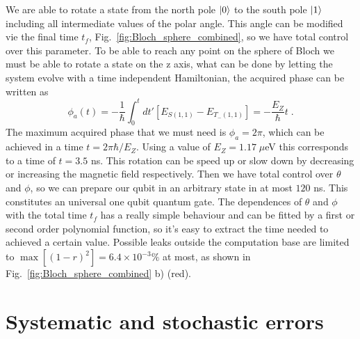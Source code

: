 We are able to rotate a state from the north pole $\ket{0}$ to the south pole $\ket{1}$ including all intermediate values of the polar angle. This angle can be modified vie the final time $t_f$, Fig.~\ref{fig:Bloch_sphere_combined}, so we have total control over this parameter. To be able to reach any point on the sphere of Bloch we must be able to rotate a state on the z axis, what can be done by letting the system evolve with a time independent Hamiltonian, the acquired phase can be written as
\begin{equation}
	\phi_a(t)=-\frac{1}{\hbar}\int_0^t dt'[E_{S(1,1)}-E_{T_-(1,1)}]=-\frac{E_Z}{\hbar}t\; .
\end{equation}
The maximum acquired phase that we must need is $\phi_a=2\pi$, which can be achieved in a time $t=2\pi\hbar/E_Z$. Using a value of $E_Z=1.17\; \mu$eV this corresponds to a time of $t=3.5$ ns. This rotation can be speed up or slow down by decreasing or increasing the magnetic field respectively. Then we have total control over $\theta$ and $\phi$, so we can prepare our qubit in an arbitrary state in at most $120$ ns. This constitutes an universal one qubit quantum gate. The dependences of $\theta$ and $\phi$ with the total time $t_f$ has a really simple behaviour and can be fitted by a first or second order polynomial function, so it's easy to extract the time needed to achieved a certain value. Possible leaks outside the computation base are limited to $\max[(1-r)^2]=6.4\times10^{-3}\%$ at most, as shown in Fig.~\ref{fig:Bloch_sphere_combined} b) (red).
\section{Systematic and stochastic errors}
